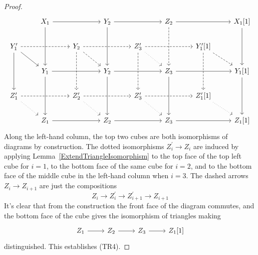 \documentclass[dissertation.tex]{subfiles}
\begin{document}
\begin{thm}
\begin{proof}
$$\begin{tikzcd}
      & X_1\arrow{rr}\arrow{dd} & & Y_2\arrow{rr}\arrow{dd}& & Z_2\arrow{rr}\arrow[dashed]{dd} & & X_1[1]\arrow{dd}\\
      Y_1^\prime\arrow[dashed]{rr}\arrow{dd}\arrow{rd} & & Y_2\arrow[dashed]{rr}\arrow[dashed]{rd}\arrow[dashed]{dd} & & Z_3^\prime\arrow[dashed]{dd}\arrow[dashed]{rr}\arrow[dotted]{rd} & & Y_1^\prime[1]\arrow[dashed]{dd}\arrow[dashed]{rd}\\
      & Y_1\arrow{rr}\arrow{dd} & & Y_2\arrow{rr}\arrow{dd} & & Z_3\arrow{rr}\arrow{dd} & & Y_1[1]\arrow{dd}\\
      Z_1^\prime\arrow[dashed]{rr}\arrow[dotted]{rd} & & Z_2^\prime\arrow[dashed]{rr}\arrow[dotted]{rd} & & Z_3^\prime\arrow[dashed]{rr}\arrow[dotted]{rd} & & Z_1^\prime[1]\arrow[dotted]{rd}\\
      & Z_1 \arrow{rr} & & Z_2\arrow{rr} & & Z_3\arrow{rr} & & Z_1[1]
    \end{tikzcd}$$
    Along the left-hand column, the top two cubes are both isomorphisms of diagrams by construction.
    The dotted isomorphisms $Z_i^\prime \to Z_i$ are induced by applying Lemma~\ref{ExtendTriangleIsomorphism} to the top face of the top left cube for $i = 1$, to the bottom face of the same cube for $i = 2$, and to the bottom face of the middle cube in the left-hand column when $i = 3$.
    The dashed arrows $Z_i \to Z_{i+1}$ are just the compositions
    $$Z_i \to Z_i^\prime \to Z_{i+1}^\prime \to Z_{i+1}$$
    It's clear that from the construction the front face of the diagram commutes, and the bottom face of the cube gives the isomorphism of triangles making 
    $$\begin{tikzcd}
      Z_1 \arrow{r} & Z_2 \arrow{r} & Z_3 \arrow{r} & Z_1[1]
    \end{tikzcd}$$
    distinguished.
    This establishes (TR4).
    

\end{proof}
\end{thm}
\end{document}

